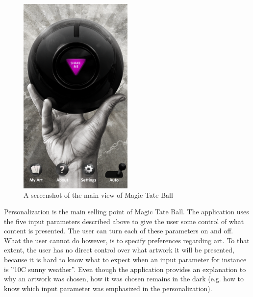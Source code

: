 \begin{figure}[h!]
	\centering
	\includegraphics[width=0.5\textwidth]{fig/tateball_screenshot}
	\caption{A screenshot of the main view of Magic Tate Ball}
	\label{Fig:tateball_screenshot}
\end{figure}

Personalization is the main selling point of Magic Tate Ball. The application uses the five input parameters described above to give the user some control of what content is presented. The user can turn each of these parameters on and off. What the user cannot do however, is to specify preferences regarding art. To that extent, the user has no direct control over what artwork it will be presented, because it is hard to know what to expect when an input parameter for instance is ”10\degree C sunny weather”. Even though the application provides an explanation to why an artwork was chosen, how it was chosen remains in the dark (e.g. how to know which input parameter was emphasized in the personalization).

\cleardoublepage